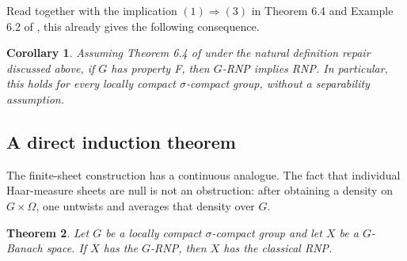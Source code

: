 \documentclass[11pt]{article}
\newtheorem{theorem}{Theorem}[section]
\newtheorem{corollary}[theorem]{Corollary}
\theoremstyle{remark}
\begin{document}
Read together with the implication $(1)\Rightarrow(3)$ in Theorem 6.4 and
Example 6.2 of \cite{DDJR}, this already gives the following consequence.

\begin{corollary}\label{cor:propertyF}
Assuming Theorem 6.4 of \cite{DDJR} under the natural definition repair
discussed above, if $G$ has property F, then $G$-RNP implies RNP.  In
particular, this holds for every locally compact $\sigma$-compact group,
without a separability assumption.
\end{corollary}

\subsection{A direct induction theorem}

The finite-sheet construction has a continuous analogue.  The fact that
individual Haar-measure sheets are null is not an obstruction: after obtaining
a density on $G\times\Omega$, one untwists and averages that density over
$G$.

\begin{theorem}\label{thm:lcsc}
Let $G$ be a locally compact $\sigma$-compact group and let $X$ be a
$G$-Banach space.  If $X$ has the $G$-RNP, then $X$ has the classical RNP.
\end{theorem}
\end{document}

